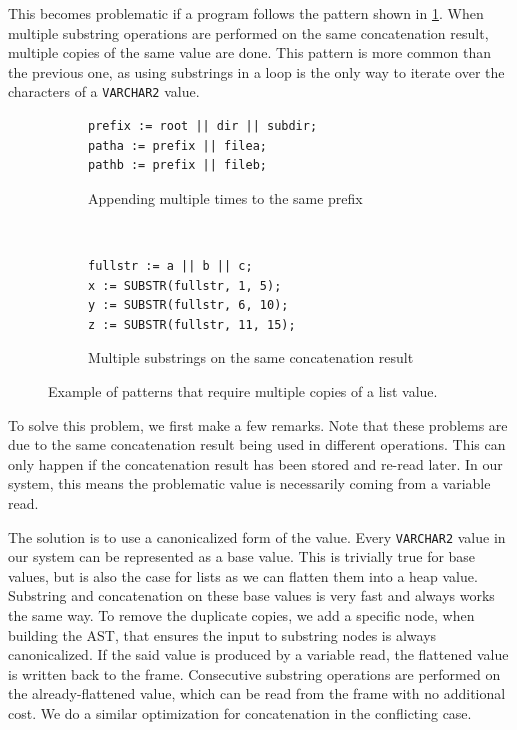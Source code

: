 \documentclass[twoside,11pt,a4paper]{article}
\newcommand{\pls}[1]{\texttt{#1}}
\newcommand{\plstype}[1]{\pls{#1}}
\newcommand{\varchar}{\plstype{VARCHAR2}}
\begin{document}

This becomes problematic if a program follows the pattern shown in \ref{fig:substrcanonpattern}. When multiple substring operations are performed on the same concatenation result, multiple copies of the same value are done. This pattern is more common than the previous one, as using substrings in a loop is the only way to iterate over the characters of a \varchar{} value.

\begin{figure}[tb]
	\begin{subfigure}[h]{\textwidth}
		\begin{lstlisting}[style=PLSQL, frame=L]
prefix := root || dir || subdir;
patha := prefix || filea;
pathb := prefix || fileb;
		\end{lstlisting}
		\caption{Appending multiple times to the same prefix}
	\end{subfigure}
	\,
	\begin{subfigure}[h]{\textwidth}
		\begin{lstlisting}[style=PLSQL, frame=L]
fullstr := a || b || c;
x := SUBSTR(fullstr, 1, 5);
y := SUBSTR(fullstr, 6, 10);
z := SUBSTR(fullstr, 11, 15);
		\end{lstlisting}
		\caption{Multiple substrings on the same concatenation result}
		\label{fig:substrcanonpattern}
	\end{subfigure}
	
	\caption{Example of patterns that require multiple copies of a list value.}
	\label{fig:canonpatterns}
\end{figure}

To solve this problem, we first make a few remarks. Note that these problems are due to the same concatenation result being used in different operations. This can only happen if the concatenation result has been stored and re-read later. In our system, this means the problematic value is necessarily coming from a variable read.

The solution is to use a canonicalized form of the value. Every \varchar{} value in our system can be represented as a base value. This is trivially true for base values, but is also the case for lists as we can flatten them into a heap value. Substring and concatenation on these base values is very fast and always works the same way. To remove the duplicate copies, we add a specific node, when building the AST, that ensures the input to substring nodes is always canonicalized. If the said value is produced by a variable read, the flattened value is written back to the frame. Consecutive substring operations are performed on the already-flattened value, which can be read from the frame with no additional cost. We do a similar optimization for concatenation in the conflicting case.
\end{document}
